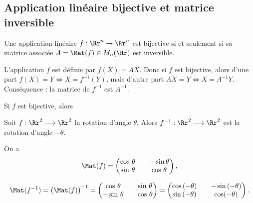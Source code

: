 \documentclass[class=report,crop=false]{standalone}
\begin{document}
\subsection{Application linéaire bijective et matrice inversible}



\begin{theoreme}
\label{th:matinv}
Une application linéaire $f : \Rr^n \to \Rr^n$ est bijective
si et seulement si sa matrice associée $A= \Mat(f) \in M_n(\Rr)$
 est inversible.
\end{theoreme}

L'application $f$ est définie par $f(X) = AX$.
Donc si $f$ est bijective, alors
d'une part $f(X)=Y \iff X = f^{-1}(Y)$,
mais d'autre part $AX=Y \iff X = A^{-1}Y$.
Conséquence : la matrice de $f^{-1}$ est $A^{-1}$.
\begin{corollaire}
Si $f$ est bijective, alors
\end{corollaire}



\begin{exemple}
Soit $f: \Rr^2 \longrightarrow \Rr^2$ la rotation d'angle $\theta$.
Alors $f^{-1}: \Rr^2 \longrightarrow \Rr^2$ est la rotation d'angle $-\theta$.

On a
$$\Mat(f) =
\begin{pmatrix}
\cos\, \theta & & -\sin \theta\\
\sin\, \theta &&\cos\, \theta
\end{pmatrix},$$

$$\Mat(f^{-1}) = \big(\Mat (f) \big)^{-1}
= \begin{pmatrix}
\cos\, \theta &&\sin \,\theta\\
-\sin\, \theta && \cos\,\theta
\end{pmatrix}
= \begin{pmatrix}
\cos\, (-\theta ) && -\sin\, (-\theta )\\
\sin\, (-\theta ) && \cos (-\theta )
  \end{pmatrix}.
$$
\end{exemple}
\end{document}
